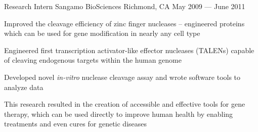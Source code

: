 

\begin{cventries}

  \cventry
  {Research Intern} %
  {Sangamo BioSciences} %
  {Richmond, CA} %
  {May 2009 --- June 2011} %
  {
    \begin{cvitems} %
    \item {Improved the cleavage efficiency of zinc finger nucleases – engineered proteins which can be used for gene modification in nearly any cell type}
    \item {Engineered first transcription activator-like effector nucleases (TALENs) capable of cleaving endogenous targets within the human genome}
    \item {Developed novel {\em in-vitro} nuclease cleavage assay and wrote software tools to analyze data}
    \item This research resulted in the creation of accessible and effective tools for gene therapy, which can be used directly to improve human health by enabling treatments and even cures for genetic diseases
    \end{cvitems}
  }


\end{cventries}
